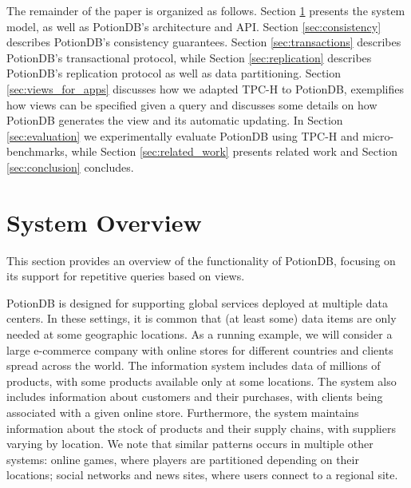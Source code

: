 \documentclass{vldb}
\newcommand{\outline}[1]{}
\begin{document}
The remainder of the paper is organized as follows.
Section \ref{sec:overview} presents the system model, as well as PotionDB's architecture and API.
Section \ref{sec:consistency} describes PotionDB's consistency guarantees.
Section \ref{sec:transactions} describes PotionDB's transactional protocol, while Section \ref{sec:replication} describes PotionDB's replication protocol as well as data partitioning.
Section \ref{sec:views_for_apps} discusses how we adapted TPC-H to PotionDB, exemplifies how views can be specified given a query and discusses some details on how PotionDB generates the view and its automatic updating.
In Section \ref{sec:evaluation} we experimentally evaluate PotionDB using TPC-H and micro-benchmarks, while Section \ref{sec:related_work} presents related work and Section \ref{sec:conclusion} concludes.


%

\section{System Overview}
\label{sec:overview}

This section provides an overview of the functionality of PotionDB, focusing on its support for 
repetitive queries based on views.

PotionDB is designed for supporting global services deployed at multiple data centers. In these settings,
it is common that (at least some) data items are only needed at some geographic locations. 
As a running example, we will consider a large e-commerce company with online stores for different countries 
and clients spread across the world. 
The information system includes data of millions of products, with some products available only at some locations.
The system also includes information about customers and their purchases, with clients being associated with a given 
online store.
Furthermore, the system maintains information about the stock of products and their supply chains, with suppliers varying by location.
We note that similar patterns occurs in multiple other systems: online games, where players are partitioned depending
on their locations; social networks and news sites, where users connect to a regional site.
\end{document}
